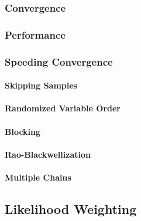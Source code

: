             \subsubsection{Convergence} %

            \subsubsection{Performance} %

            \subsubsection{Speeding Convergence} %

                \paragraph{Skipping Samples} %

                \paragraph{Randomized Variable Order} %

                \paragraph{Blocking} %

                \paragraph{Rao-Blackwellization} %

                \paragraph{Multiple Chains} %

        \subsection{Likelihood Weighting} %

